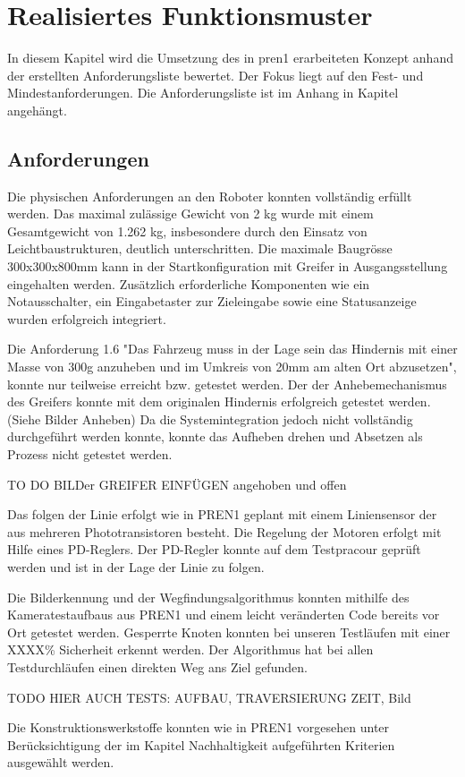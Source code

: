 \section{Realisiertes Funktionsmuster}

In diesem Kapitel wird die Umsetzung des in \acrshort{pren1} erarbeiteten Konzept anhand der  erstellten Anforderungsliste bewertet. Der Fokus liegt auf den Fest- und Mindestanforderungen. Die Anforderungsliste ist im Anhang in Kapitel  angehängt.

\subsection{Anforderungen}

Die physischen Anforderungen an den Roboter konnten vollständig erfüllt werden. Das maximal zulässige Gewicht von 2 kg wurde mit einem Gesamtgewicht von 1.262 kg, insbesondere durch den Einsatz von Leichtbaustrukturen, deutlich unterschritten. Die maximale Baugrösse 300x300x800mm kann in der Startkonfiguration mit Greifer in Ausgangsstellung eingehalten werden. Zusätzlich erforderliche Komponenten wie ein Notausschalter, ein Eingabetaster zur Zieleingabe sowie eine Statusanzeige wurden erfolgreich integriert.

Die Anforderung 1.6 "Das Fahrzeug muss in der Lage sein das Hindernis mit  einer Masse von 300g anzuheben und im Umkreis von 20mm am alten Ort abzusetzen", konnte nur teilweise erreicht bzw. getestet werden. Der der Anhebemechanismus des Greifers konnte mit dem originalen Hindernis erfolgreich getestet werden. (Siehe Bilder Anheben) Da die Systemintegration jedoch nicht vollständig durchgeführt werden konnte, konnte das Aufheben drehen und Absetzen als Prozess nicht getestet werden.

TO DO BILDer GREIFER EINFÜGEN angehoben und offen

Das folgen der Linie erfolgt wie in PREN1 geplant mit einem Liniensensor der aus mehreren Phototransistoren besteht. Die Regelung der Motoren erfolgt mit Hilfe eines PD-Reglers. Der PD-Regler konnte auf dem Testpracour geprüft werden und ist in der Lage der Linie zu folgen. 

Die Bilderkennung und der Wegfindungsalgorithmus  konnten mithilfe des Kameratestaufbaus aus PREN1 und einem leicht veränderten Code bereits vor Ort getestet werden. Gesperrte Knoten konnten bei unseren Testläufen mit einer XXXX\% Sicherheit erkennt werden. Der Algorithmus hat bei allen Testdurchläufen einen direkten Weg ans Ziel gefunden. 

 TODO HIER AUCH TESTS: AUFBAU, TRAVERSIERUNG ZEIT, Bild

Die Konstruktionswerkstoffe konnten wie in PREN1 vorgesehen unter Berücksichtigung der im Kapitel Nachhaltigkeit aufgeführten Kriterien ausgewählt werden.